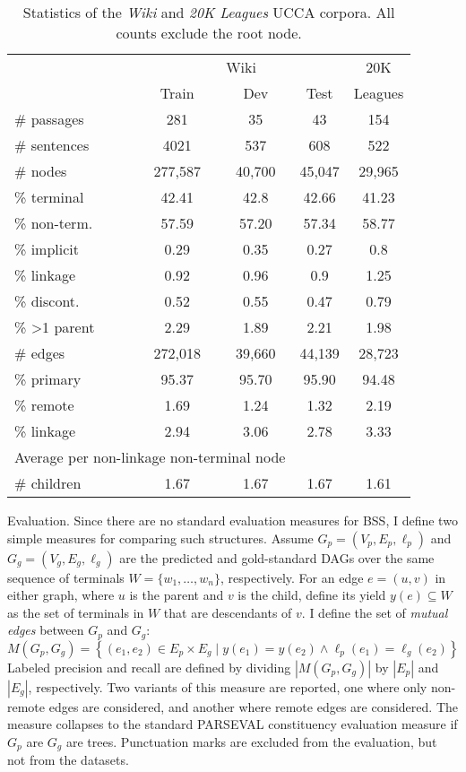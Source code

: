 \documentclass[11pt]{article}
\makeatletter
\renewcommand{\paragraph}{
  \@startsection{paragraph}{4}
  {\z@}{.3ex \@plus .3ex \@minus .2ex}{-1em}
  {\normalfont\normalsize\bfseries}
}
\makeatother
\begin{document}
\begin{table}
  \centering
\begin{tabular}{l|ccc|c}
& \multicolumn{3}{c|}{Wiki} & 20K \\
& \small Train & \small Dev & \small Test & Leagues \\
\hline
\# passages & 281 & 35 & 43 & 154 \\
\# sentences & 4021 & 537 & 608 & 522 \\
\hline
\# nodes & 277,587 & 40,700 & 45,047 & 29,965 \\
\% terminal & 42.41 & 42.8 & 42.66 & 41.23 \\
\% non-term. & 57.59 & 57.20 & 57.34 & 58.77 \\
\% implicit & 0.29 & 0.35 & 0.27 & 0.8 \\
\% linkage & 0.92 & 0.96 & 0.9 & 1.25 \\
\% discont. & 0.52 & 0.55 & 0.47 & 0.79 \\
\% \textgreater 1 parent & 2.29 & 1.89 & 2.21 & 1.98 \\
\hline
\# edges & 272,018 & 39,660 & 44,139 & 28,723 \\
\% primary & 95.37 & 95.70 & 95.90 & 94.48 \\
\% remote & 1.69 & 1.24 & 1.32 & 2.19 \\
\% linkage & 2.94 & 3.06 & 2.78 & 3.33 \\
\hline
\multicolumn{3}{l}{\footnotesize Average per non-linkage non-terminal node} \\
\# children & 1.67 & 1.67 & 1.67 & 1.61 
\end{tabular}
\caption{Statistics of the \textit{Wiki} and \textit{20K Leagues} UCCA corpora.
All counts exclude the root node.
}
\label{table:data}
\end{table}

\paragraph{Evaluation.}
Since there are no standard evaluation measures for BSS, I define
two simple measures for comparing such structures.
Assume $G_p=(V_p,E_p,\ell_p)$ and $G_g=(V_g,E_g,\ell_g)$
are the predicted and gold-standard DAGs over the same
sequence of terminals $W = \{w_1,\ldots,w_n\}$, respectively.
For an edge $e=(u,v)$ in either graph,
where $u$ is the parent and $v$ is the child, define its yield $y(e) \subseteq W$ as the
set of terminals in $W$ that are descendants of $v$.
I define the set of \textit{mutual edges} between $G_p$ and $G_g$:
\[
  M(G_p,G_g) =
  \left\{(e_1,e_2) \in E_p \times E_g \;|\;
  y(e_1) = y(e_2) \wedge \ell_p(e_1)=\ell_g(e_2)\right\}
\]
Labeled precision and recall are defined by dividing $|M(G_p,G_g)|$ by $|E_p|$ and $|E_g|$, respectively.
Two variants of this measure are reported, one where only non-remote edges are considered,
and another where remote edges are considered. The measure collapses to the standard
PARSEVAL constituency evaluation measure if $G_p$ are $G_g$ are trees.
Punctuation marks are excluded from the evaluation, but not from the datasets.
\end{document}
